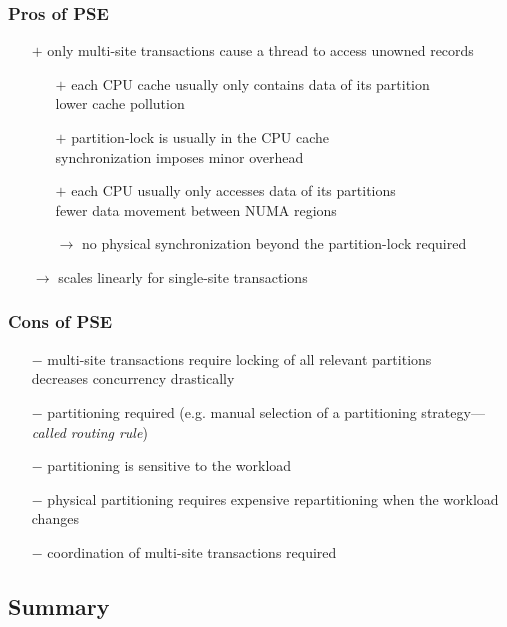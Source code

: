 \begin{frame}
	\frametitle{Pros of PSE}
	
	\begin{itemize}
		\item[$+$]	only multi-site transactions cause a thread to access unowned records
			\begin{itemize}
				\item[$+$]	each CPU cache usually only contains data of its partition \\ \bm{$\rightarrow$} lower cache pollution
				\item[$+$]	partition-lock is usually in the CPU cache \\ \bm{$\rightarrow$} synchronization imposes minor overhead
				\item[$+$]	each CPU usually only accesses data of its partitions \\ \bm{$\rightarrow$} fewer data movement between NUMA regions
				\item[$\rightarrow$]	no physical synchronization beyond the partition-lock required
			\end{itemize}
		\item[$\rightarrow$]	scales linearly for single-site transactions
	\end{itemize}
\end{frame}

\begin{frame}
	\frametitle{Cons of PSE}
	
	\begin{itemize}
		\item[$-$]	multi-site transactions require locking of all relevant partitions \\ \bm{$\rightarrow$} decreases concurrency drastically
		\item[$-$]	partitioning required (e.g. manual selection of a partitioning strategy---\textit{called routing rule})
		\item[$-$]	partitioning is sensitive to the workload
		\item[$-$]	physical partitioning requires expensive repartitioning when the workload changes
		\item[$-$]	coordination of multi-site transactions required
	\end{itemize}
\end{frame}

\subsection[Summary]{Summary}


